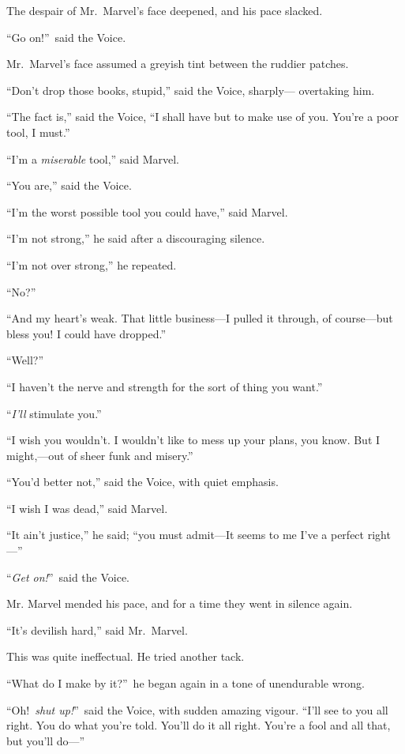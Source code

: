 The despair of Mr.\ Marvel’s face deepened, and his pace slacked.

“Go on!”\ said the Voice.

Mr.\ Marvel’s face assumed a greyish tint between the ruddier patches.

“Don’t drop those books, stupid,” said the Voice, sharply—\linebreak{} overtaking him.

“The fact is,” said the Voice, “I shall have but to make use of you. You’re a poor tool, I must.”

“I’m a \emph{miserable} tool,” said Marvel.

“You are,” said the Voice.

“I’m the worst possible tool you could have,” said Marvel.

“I’m not strong,” he said after a discouraging silence.

“I’m not over strong,” he repeated.

“No?”

“And my heart’s weak. That little business—I pulled it through, of course—but bless you! I could have dropped.”

“Well?”

“I haven’t the nerve and strength for the sort of thing you want.”

“\emph{I’ll} stimulate you.”

“I wish you wouldn’t. I wouldn’t like to mess up your plans, you know. But I might,—out of sheer funk and misery.”

“You’d better not,” said the Voice, with quiet emphasis.

“I wish I was dead,” said Marvel.

“It ain’t justice,” he said; “you must admit—It seems to me I’ve a perfect right—”

“\emph{Get on!}”\ said the Voice.

Mr. Marvel mended his pace, and for a time they went in silence again.

“It’s devilish hard,” said Mr.\ Marvel.

This was quite ineffectual. He tried another tack.

“What do I make by it?”\ he began again in a tone of unendurable wrong.

“Oh!\ \emph{shut up!}”\ said the Voice, with sudden amazing vigour. “I’ll see to you all right. You do what you’re told. You’ll do it all right. You’re a fool and all that, but you’ll do—”

